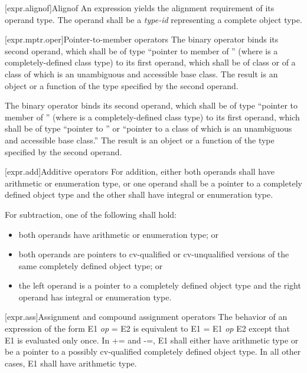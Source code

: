 \documentclass[american]{book}
\begin{document}
\setcounter{subsection}{5}
[expr.alignof]{Alignof}
An  expression yields the alignment requirement of its
operand type.  The operand shall be a \emph{type-id} representing a
complete
object type. 

\setcounter{section}{4}
[expr.mptr.oper]{Pointer-to-member operators}
\setcounter{Paras}{1}
\pnum
The binary operator  binds its second operand, which shall be
of type ``pointer to member of '' (where  is a
completely-defined
class type) to its first operand, which shall be of
class  or of a class of which  is an unambiguous and
accessible base class. The result is an object or a function of the type
specified by the second operand.

\pnum
The binary operator \tcode{->*} binds its second operand, which shall be
of type ``pointer to member of '' (where  is a
completely-defined
class type) to its first operand, which shall be of
type ``pointer to '' or ``pointer to a class of which 
is an unambiguous and accessible base class.'' The result is an object
or a function of the type specified by the second operand.



\setcounter{section}{6}
[expr.add]{Additive operators}
\pnum
[...]For addition, either both operands shall have arithmetic or
enumeration type, or one operand shall be a pointer to a completely defined
object type and the other shall have integral or enumeration type. 

\pnum
For subtraction, one of the following shall hold: 
\begin{itemize}
    \item both operands have arithmetic or enumeration type; or 
    \item both operands are pointers to cv-qualified or cv-unqualified
        versions of the same completely defined
         object type; or 
    \item the left operand is a pointer to a completely defined
        object type and the right operand has integral or enumeration type. 
\end{itemize}


\setcounter{section}{16}
[expr.ass]{Assignment and compound assignment operators}
\setcounter{Paras}{6}
\pnum
The behavior of an expression of the form E1 \emph{op} = E2 is equivalent
to E1 = E1 \emph{op} E2 except that E1 is evaluated only once. In += and
-=, E1 shall either have arithmetic type or be a pointer to a possibly
cv-qualified completely defined
object type. In all other cases, E1 shall have arithmetic type. 
\end{document}
